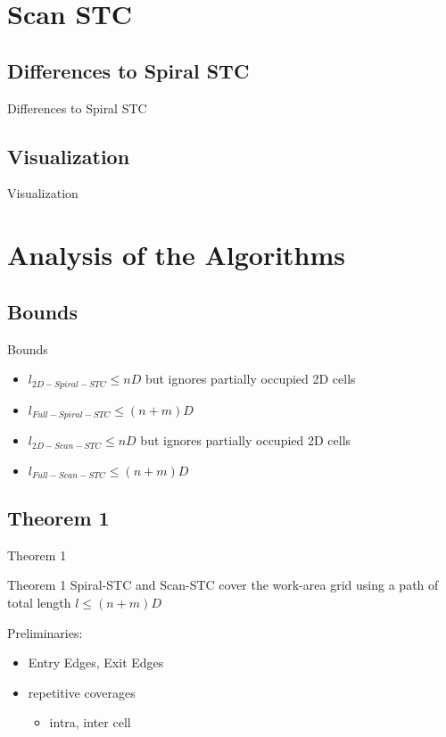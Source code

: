 \documentclass{beamer}
\begin{document}
\section{Scan STC}
\subsection{Differences to Spiral STC}
\begin{frame}{Differences to Spiral STC}
\end{frame}
\subsection{Visualization}
\begin{frame}{Visualization}
\end{frame}

\section{Analysis of the Algorithms}
\subsection{Bounds}
\begin{frame}{Bounds}
    \begin{itemize}
        \item $l_{2D-Spiral-STC} \leq nD$ but ignores partially occupied 2D cells
        \item $l_{Full-Spiral-STC} \leq (n + m)D$
        \item $l_{2D-Scan-STC} \leq nD$ but ignores partially occupied 2D cells
        \item $l_{Full-Scan-STC} \leq (n + m)D$
    \end{itemize}
\end{frame}
\subsection{Theorem 1}
\begin{frame}{Theorem 1}
    \begin{block}{Theorem 1}
        Spiral-STC and Scan-STC cover the work-area grid using a path of total length $l \leq (n + m)D$
    \end{block}
    Preliminaries:
    \begin{itemize}
        \item Entry Edges, Exit Edges
        \item repetitive coverages
              \begin{itemize}
                  \item intra, inter cell
              \end{itemize}
    \end{itemize}
\end{frame}
\end{document}
